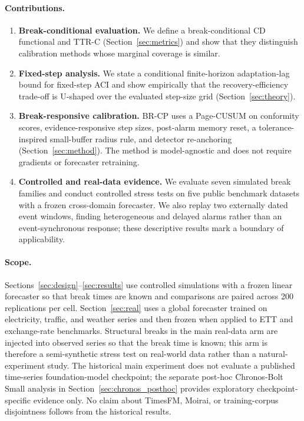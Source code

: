 \documentclass[10pt]{article}
\newcommand{\brcp}{\textsc{BR-CP}}
\begin{document}
\paragraph{Contributions.}
\begin{enumerate}\itemsep1pt
\item \textbf{Break-conditional evaluation.} We define a break-conditional CD functional and TTR-C (Section~\ref{sec:metrics}) and show that they distinguish calibration methods whose marginal coverage is similar.
\item \textbf{Fixed-step analysis.} We state a conditional finite-horizon adaptation-lag bound for fixed-step ACI and show empirically that the recovery-efficiency trade-off is U-shaped over the evaluated step-size grid (Section~\ref{sec:theory}).
\item \textbf{Break-responsive calibration.} \brcp{} uses a Page-CUSUM on conformity scores, evidence-responsive step sizes, post-alarm memory reset, a tolerance-inspired small-buffer radius rule, and detector re-anchoring (Section~\ref{sec:method}). The method is model-agnostic and does not require gradients or forecaster retraining.
\item \textbf{Controlled and real-data evidence.} We evaluate seven simulated break families and conduct controlled stress tests on five public benchmark datasets with a frozen cross-domain forecaster. We also replay two externally dated event windows, finding heterogeneous and delayed alarms rather than an event-synchronous response; these descriptive results mark a boundary of applicability.
\end{enumerate}

\paragraph{Scope.}
Sections~\ref{sec:design}--\ref{sec:results} use controlled simulations with a frozen linear forecaster so that break times are known and comparisons are paired across 200 replications per cell. Section~\ref{sec:real} uses a global forecaster trained on electricity, traffic, and weather series and then frozen when applied to ETT and exchange-rate benchmarks. Structural breaks in the main real-data arm are injected into observed series so that the break time is known; this arm is therefore a semi-synthetic stress test on real-world data rather than a natural-experiment study. The historical main experiment does not evaluate a published time-series foundation-model checkpoint; the separate post-hoc Chronos-Bolt Small analysis in Section~\ref{sec:chronos_posthoc} provides exploratory checkpoint-specific evidence only. No claim about TimesFM, Moirai, or training-corpus disjointness follows from the historical results.
\end{document}
